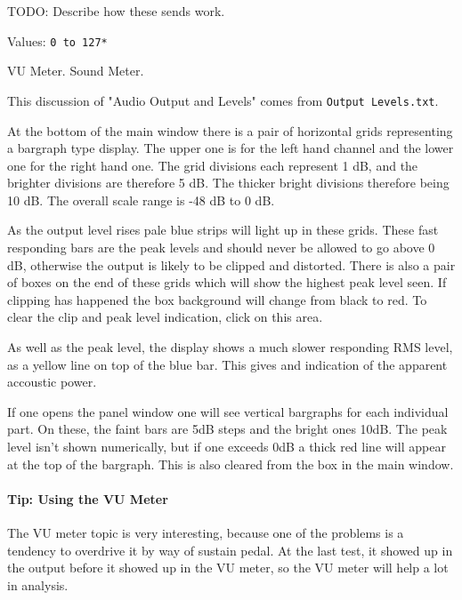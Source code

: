 
   TODO:  Describe how these sends work.

   Values: \texttt{0 to 127*}

   VU Meter.  Sound Meter.

   This discussion of "Audio Output and Levels"
   comes from \texttt{Output Levels.txt}.

   At the bottom of the main window there is a pair of horizontal grids
   representing a bargraph type display. The upper one is for the left hand
   channel and the lower one for the right hand one. The grid divisions each
   represent 1 dB, and the brighter divisions are therefore 5 dB. The thicker
   bright divisions therefore being 10 dB. The overall scale range is -48 dB to
   0 dB.

   As the output level rises pale blue strips will light up in these grids.
   These fast responding bars are the peak levels and should never be allowed
   to go above 0 dB, otherwise the output is likely to be clipped and distorted.
   There is also a pair of boxes on the end of these grids which will show the
   highest peak level seen. If clipping has happened the box background will
   change from black to red.
   To clear the clip and peak level indication, click on this area.

   As well as the peak level, the display shows a much slower responding RMS
   level, as a yellow line on top of the blue bar. This gives and indication of
   the apparent accoustic power.

   If one opens the panel window one will see vertical bargraphs for each
   individual part. On these, the faint bars are 5dB steps and the bright ones
   10dB. The peak level isn't shown numerically, but if one exceeds 0dB a thick
   red line will appear at the top of the bargraph. This is also cleared from
   the box in the main window.

\paragraph{Tip: Using the VU Meter}
\label{paragraph:tips_using_the_vu_meter}

   The VU meter topic is very interesting, because one of the problems
   is a tendency to overdrive it by way of sustain pedal.  At the last test, it
   showed up in the output before it showed up in the VU meter, so
   the VU meter will help a lot in analysis.

